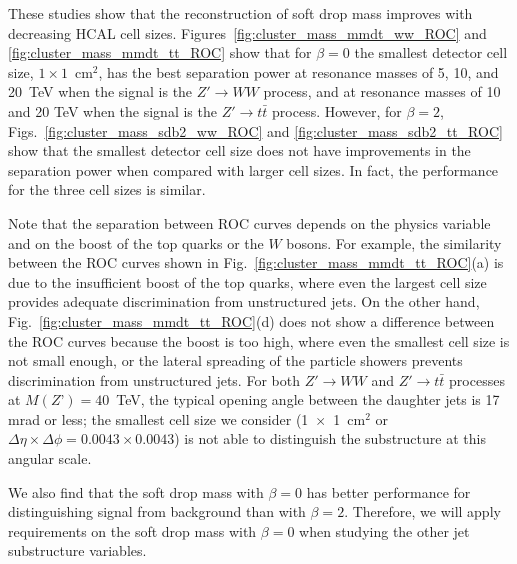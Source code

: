 These studies show that the reconstruction of soft drop mass improves with decreasing  HCAL cell sizes.
Figures~\ref{fig:cluster_mass_mmdt_ww_ROC} and 
\ref{fig:cluster_mass_mmdt_tt_ROC} show that for $\beta=0$ the 
smallest detector cell size, 
$1\times1$~cm$^2$, has the best separation power at 
resonance masses of 5, 10, and 20~TeV when the signal is the $Z' \rightarrow WW$ process,  and 
at  resonance masses of 10 and 20 TeV when the signal is the $Z' \rightarrow t\bar{t}$ process.
However, for $\beta=2$, Figs.~\ref{fig:cluster_mass_sdb2_ww_ROC} and \ref{fig:cluster_mass_sdb2_tt_ROC} 
show that the smallest detector cell size 
does not have improvements in the separation power when compared with 
larger cell sizes. In fact, the performance for the three cell sizes is  
similar. 

Note that the separation between ROC curves depends 
on the physics variable and on the boost of the top quarks or the $W$ bosons. For example, 
the similarity between the ROC curves shown in Fig.~\ref{fig:cluster_mass_mmdt_tt_ROC}(a)
is due to the insufficient boost of the top quarks, 
 where even the largest cell size provides adequate discrimination from unstructured jets.
On the other hand, Fig.~\ref{fig:cluster_mass_mmdt_tt_ROC}(d) does not show a difference 
between the ROC curves because the boost is too high,  where even the smallest  cell size is not small enough, or the lateral spreading of the particle showers 
 prevents discrimination from unstructured jets. For both $Z' \to WW$ and $Z' \to t \bar{t}$ processes at $M(Z’) = 40$~TeV, the typical opening angle between the daughter jets 
 is 17 mrad or less; the smallest cell size we consider (1~$\times$~1~cm$^2$ or $\Delta \eta \times \Delta \phi = 0.0043 \times 0.0043$) 
 is not able to distinguish the substructure at this angular scale.  

We also find that the  soft drop mass with $\beta=0$ has better 
performance for distinguishing signal from background than with  $\beta=2$. Therefore, we will 
apply requirements on the soft drop mass with $\beta=0$  when studying the other jet substructure 
variables. 
 
